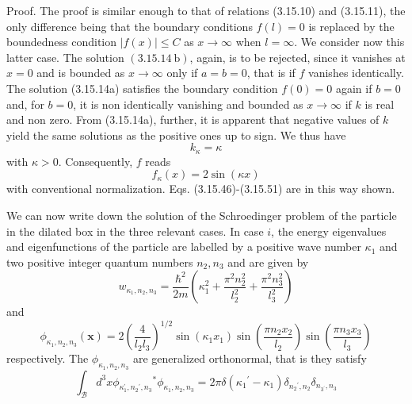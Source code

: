 \documentclass{article}
\begin{document}
Proof. The proof is similar enough to that of relations (3.15.10) and (3.15.11), the only difference being that the boundary conditions $f(l)=0$ is replaced by the
boundedness condition $|f(x)| \leq C$ as $x \rightarrow \infty$ when $l=\infty$. We consider now this latter case. The solution $(3.15 .14 \mathrm{~b})$, again, is to be rejected, since it vanishes at $x=0$ and is bounded as $x \rightarrow \infty$ only if $a=b=0$, that is if $f$ vanishes identically. The solution (3.15.14a) satisfies the boundary condition $f(0)=0$ again if $b=0$ and, for $b=0$, it is non identically vanishing and bounded as $x \rightarrow \infty$ if $k$ is real and non zero. From (3.15.14a), further, it is apparent that negative values of $k$ yield the same solutions as the positive ones up to sign. We thus have
$$
\begin{equation*}
k_{\kappa}=\kappa \tag{3.15.52}
\end{equation*}
$$
with $\kappa>0$. Consequently, $f$ reads
$$
\begin{equation*}
f_{\kappa}(x)=2 \sin (\kappa x) \tag{3.15.53}
\end{equation*}
$$
with conventional normalization. Eqs. (3.15.46)-(3.15.51) are in this way shown.

We can now write down the solution of the Schroedinger problem of the particle in the dilated box in the three relevant cases. In case $i$, the energy eigenvalues and eigenfunctions of the particle are labelled by a positive wave number $\kappa_{1}$ and two positive integer quantum numbers $n_{2}, n_{3}$ and are given by
$$
\begin{equation*}
w_{\kappa_{1}, n_{2}, n_{3}}=\frac{\hbar^{2}}{2 m}\left(\kappa_{1}^{2}+\frac{\pi^{2} n_{2}^{2}}{l_{2}^{2}}+\frac{\pi^{2} n_{3}^{2}}{l_{3}^{2}}\right) \tag{3.15.54}
\end{equation*}
$$
and
$$
\begin{equation*}
\phi_{\kappa_{1}, n_{2}, n_{3}}(\boldsymbol{x})=2\left(\frac{4}{l_{2} l_{3}}\right)^{1 / 2} \sin \left(\kappa_{1} x_{1}\right) \sin \left(\frac{\pi n_{2} x_{2}}{l_{2}}\right) \sin \left(\frac{\pi n_{3} x_{3}}{l_{3}}\right) \tag{3.15.55}
\end{equation*}
$$
respectively. The $\phi_{\kappa_{1}, n_{2}, n_{3}}$ are generalized orthonormal, that is they satisfy
$$
\begin{equation*}
\int_{\mathcal{B}} d^{3} x \phi_{\kappa_{1}^{\prime}, n_{2}{ }^{\prime}, n_{3}}{ }^{*} \phi_{\kappa_{1}, n_{2}, n_{3}}=2 \pi \delta\left(\kappa_{1}{ }^{\prime}-\kappa_{1}\right) \delta_{n_{2}{ }^{\prime}, n_{2}} \delta_{n_{3^{\prime}}, n_{3}} \tag{3.15.56}
\end{equation*}
$$
\end{document}
